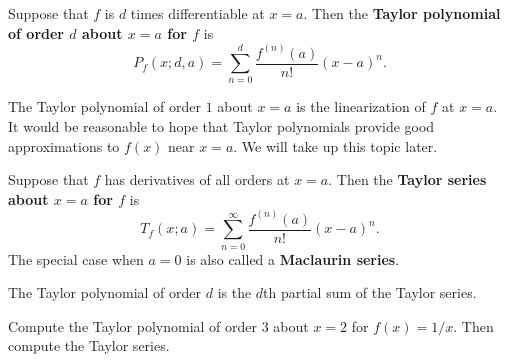 \setcounter{chapter}{10}
\setcounter{section}{8}
\setcounter{theorem}{0}
\setcounter{equation}{0}


\begin{definition}
Suppose that $f$ is $d$ times differentiable at $x=a$.
Then the \textbf{Taylor polynomial of order $d$ about $x=a$ for $f$} is
\begin{equation*}
P_f(x; d, a) = \sum_{n=0}^d\frac{f^{(n)}(a)}{n!}(x-a)^n.
\end{equation*}
\end{definition}
\begin{remark}
The Taylor polynomial of order $1$ about $x=a$ is the linearization of $f$ at $x=a$.
It would be reasonable to hope that Taylor polynomials provide good approximations to $f(x)$ near $x=a$.
We will take up this topic later.
\end{remark}

\vfill 

\begin{definition}
Suppose that $f$ has derivatives of all orders at $x=a$.
Then the \textbf{Taylor series about $x=a$ for $f$} is
\begin{equation*}
T_f(x; a) = \sum_{n=0}^\infty \frac{f^{(n)}(a)}{n!}(x-a)^n.
\end{equation*}
The special case when $a=0$ is also called a \textbf{Maclaurin series}.
\end{definition}

\begin{remark}
The Taylor polynomial of order $d$ is the $d$th partial sum of the Taylor series.
\end{remark}

\vfill

\newpage

\begin{example}
Compute the Taylor polynomial of order $3$ about $x=2$ for $f(x) = 1/x$.
Then compute the Taylor series.
\end{example}

